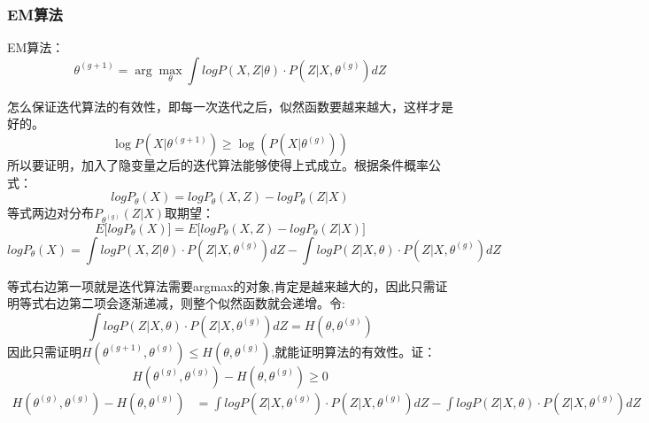 \documentclass[UTF8]{ctexart} %
\begin{document}
		\subsubsection{EM算法}
			EM算法：
			\[\theta^{(g+1)} = \arg\max_{\theta}\int logP(X,Z|\theta)\cdot P(Z|X,\theta^{(g)})dZ\]
			
			怎么保证迭代算法的有效性，即每一次迭代之后，似然函数要越来越大，这样才是好的。
			\[\log P(X  |\theta^{(g+1)}) \geq \log(P(X|\theta^{(g)}))\]
			所以要证明，加入了隐变量之后的迭代算法能够使得上式成立。根据条件概率公式：
			\[logP_\theta(X) = logP_\theta(X,Z) - logP_\theta(Z|X)\]
			等式两边对分布$P_{\theta^{(g)}}(Z|X)$取期望：
			\[E\big[logP_\theta(X)\big] = E\big[logP_\theta(X,Z) - logP_\theta(Z|X)\big]\]
			\[logP_\theta(X) = \int logP(X,Z|\theta)\cdot P(Z|X,\theta^{(g)})dZ-
			\int logP(Z|X,\theta)\cdot P(Z|X,\theta^{(g)})dZ \]
			
			等式右边第一项就是迭代算法需要argmax的对象,肯定是越来越大的，因此只需证明等式右边第二项会逐渐递减，则整个似然函数就会递增。令:
			\[\int logP(Z|X,\theta)\cdot P(Z|X,\theta^{(g)})dZ = H(\theta, \theta^{(g)})\]
			因此只需证明$H(\theta^{(g+1)}, \theta^{(g)}) \leq  H(\theta, \theta^{(g)})$,就能证明算法的有效性。证：
			\[H(\theta^{(g)}, \theta^{(g)}) -  H(\theta, \theta^{(g)})\geq 0\]
			\[\begin{aligned}
			H(\theta^{(g)}, \theta^{(g)}) -  H(\theta, \theta^{(g)})&=\int logP(Z|X,\theta^{(g)})\cdot P(Z|X,\theta^{(g)})dZ-\int logP(Z|X,\theta)\cdot P(Z|X,\theta^{(g)})dZ
			\end{aligned}\]
			
			
			
			
			
			
				
			
		
			
			
\end{document}
